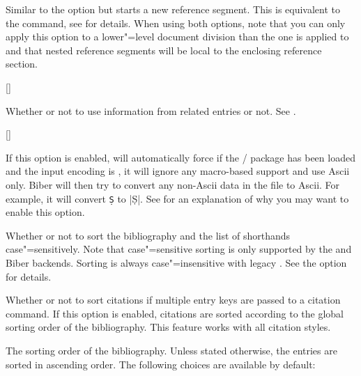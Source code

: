 \documentclass{ltxdockit}[2011/03/25]
\newcommand*{\biber}{Biber\xspace}
\begin{document}
\begin{optionlist}
Similar to the  option but starts a new reference segment. This is equivalent to the  command, see  for details. When using both options, note that you can only apply this option to a lower"=level document division than the one  is applied to and that nested reference segments will be local to the enclosing reference section.

[\BiberOnly]

Whether or not to use information from related entries or not. See .

[\BiberOnly]

If this option is enabled,  will automatically force  if the \slash {} package has been loaded and the input encoding is \utf, \ie it will ignore any macro-based \utf support and use Ascii only. \biber will then try to convert any non-Ascii data in the  file to Ascii. For example, it will convert \texttt{\d{S}} to |\d{S}|. See  for an explanation of why you may want to enable this option.


Whether or not to sort the bibliography and the list of shorthands case"=sensitively. Note that case"=sensitive sorting is only supported by the  and \biber backends. Sorting is always case"=insensitive with legacy \bibtex. See the  option for details.


Whether or not to sort citations if multiple entry keys are passed to a citation command. If this option is enabled, citations are sorted according to the global sorting order of the bibliography. This feature works with all citation styles.


The sorting order of the bibliography. Unless stated otherwise, the entries are sorted in ascending order. The following choices are available by default:


\end{optionlist}
\end{document}
